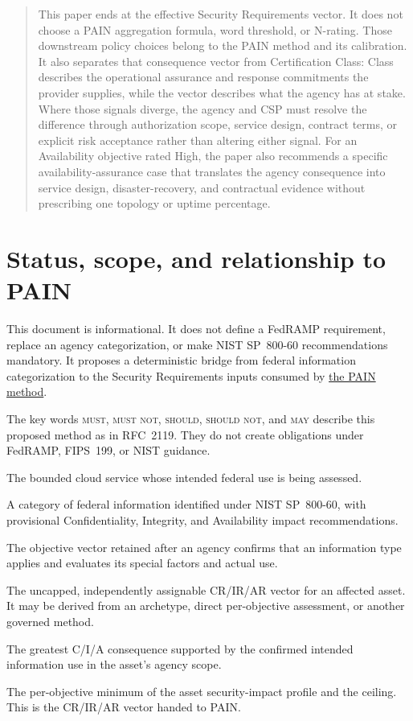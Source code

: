 \documentclass[11pt]{article}
\newcommand{\rfckw}[1]{\textsc{#1}}
\newcommand{\painpaper}{\href{https://stackarmor.github.io/rfc-fedramp-vdr/vdr-pain-cvss.pdf}{the PAIN method}}
\begin{document}
\begin{abstract}
This paper ends at the effective Security Requirements vector. It does not choose a
PAIN aggregation formula, word threshold, or N-rating. Those downstream policy
choices belong to the PAIN method and its calibration. It also separates that
consequence vector from Certification Class: Class describes the operational
assurance and response commitments the provider supplies, while the vector
describes what the agency has at stake. Where those signals diverge, the agency and
CSP must resolve the difference through authorization scope, service design,
contract terms, or explicit risk acceptance rather than altering either signal.
For an Availability objective rated High, the paper also recommends a specific
availability-assurance case that translates the agency consequence into service
design, disaster-recovery, and contractual evidence without prescribing one
topology or uptime percentage.
\end{abstract}

\tableofcontents

\section{Status, scope, and relationship to PAIN}

This document is informational. It does not define a FedRAMP requirement, replace an
agency categorization, or make NIST SP~800-60 recommendations mandatory. It proposes
a deterministic bridge from federal information categorization to the
Security Requirements inputs consumed by \painpaper{}.

The key words \rfckw{must}, \rfckw{must not}, \rfckw{should},
\rfckw{should not}, and \rfckw{may} describe this proposed method as in RFC~2119.
They do not create obligations under FedRAMP, FIPS~199, or NIST guidance.

\begin{description}[leftmargin=1.6em,style=nextline]
\item[Cloud Service Offering (CSO)] The bounded cloud service whose intended federal
  use is being assessed.
\item[Information type] A category of federal information identified under NIST
  SP~800-60, with provisional Confidentiality, Integrity, and Availability impact
  recommendations.
\item[Applied profile] The objective vector retained after an agency confirms that
  an information type applies and evaluates its special factors and actual use.
\item[Asset security-impact profile] The uncapped, independently assignable
  CR/IR/AR vector for an affected asset. It may be derived from an archetype,
  direct per-objective assessment, or another governed method.
\item[Security-requirements ceiling] The greatest C/I/A consequence supported by
  the confirmed intended information use in the asset's agency scope.
\item[Effective requirements] The per-objective minimum of the asset
  security-impact profile and the ceiling. This is the CR/IR/AR vector handed to
  PAIN.
\end{description}
\end{document}
